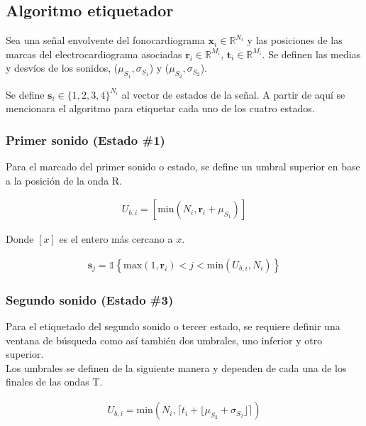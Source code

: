 \subsection*{Algoritmo etiquetador}

\indent Sea una señal envolvente del fonocardiograma $\bm{x}_i \in \mathbb{R}^{N_i}$ y las posiciones de las marcas
del electrocardiograma asociadas $\bm{r}_i \in \mathbb{R}^{M_i}$, $\mathbf{t}_i \in \mathbb{R}^{M_i}$. Se definen
las medias y desvíos de los sonidos, ($\mu_{S_1}, \sigma_{S_1}$) y ($\mu_{S_2}, \sigma_{S_2}$). \bigskip

\indent Se define $\mathbf{s}_i \in \{1,2,3,4\}^{N_i}$ al vector de estados de la señal.
A partir de aquí se mencionara el algoritmo para etiquetar cada uno de los cuatro estados.

\subsubsection*{Primer sonido (Estado \#1)}

\indent Para el marcado del primer sonido o estado, se define un umbral superior en base a la posición de la onda R.

\begin{align}
  U_{b,i} = \left[\mathrm{min}(N_i,\mathbf{r}_i+\mu_{S_1})\right]
\end{align}

\indent Donde $[x]$ es el entero más cercano a $x$.

\begin{align}
  \bm{s}_j = \mathds{1}\left\{\mathrm{max}(1, \mathbf{r}_i) < j < \mathrm{min}(U_{b,i}, N_i)\right\}
\end{align}

\subsubsection*{Segundo sonido (Estado \#3)}

\indent Para el etiquetado del segundo sonido o tercer estado, se requiere definir una ventana de búsqueda como así
también dos umbrales, uno inferior y otro superior. \\
\indent Los umbrales se definen de la siguiente manera y dependen de cada una de los finales de las ondas T.

\begin{align}
  U_{b,i} = \mathrm{min}(N_i,\lceil t_i+\lfloor \mu_{S_2} + \sigma_{S_2} \rfloor \rceil)
\end{align}

